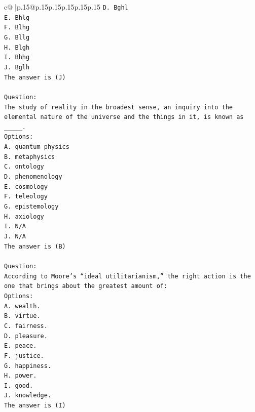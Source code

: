 \documentclass{article}
\begin{document}
{\begin{supertabular}{c@{$\;$}|p{.15\linewidth}@{}p{.15\linewidth}p{.15\linewidth}p{.15\linewidth}p{.15\linewidth}p{.15\linewidth}}
{{{\texttt{D. Bghl} \\
\texttt{E. Bhlg} \\
\texttt{F. Blhg} \\
\texttt{G. Bllg} \\
\texttt{H. Blgh} \\
\texttt{I. Bhhg} \\
\texttt{J. Bglh} \\
\texttt{The answer is (J)} \\
\\ 
\texttt{Question:} \\
\texttt{The study of reality in the broadest sense, an inquiry into the elemental nature of the universe and the things in it, is known as \_\_\_\_\_.} \\
\texttt{Options:} \\
\texttt{A. quantum physics} \\
\texttt{B. metaphysics} \\
\texttt{C. ontology} \\
\texttt{D. phenomenology} \\
\texttt{E. cosmology} \\
\texttt{F. teleology} \\
\texttt{G. epistemology} \\
\texttt{H. axiology} \\
\texttt{I. N/A} \\
\texttt{J. N/A} \\
\texttt{The answer is (B)} \\
\\ 
\texttt{Question:} \\
\texttt{According to Moore’s “ideal utilitarianism,” the right action is the one that brings about the greatest amount of:} \\
\texttt{Options:} \\
\texttt{A. wealth.} \\
\texttt{B. virtue.} \\
\texttt{C. fairness.} \\
\texttt{D. pleasure.} \\
\texttt{E. peace.} \\
\texttt{F. justice.} \\
\texttt{G. happiness.} \\
\texttt{H. power.} \\
\texttt{I. good.} \\
\texttt{J. knowledge.} \\
\texttt{The answer is (I)} \\
}}}
\end{supertabular}}
\end{document}

